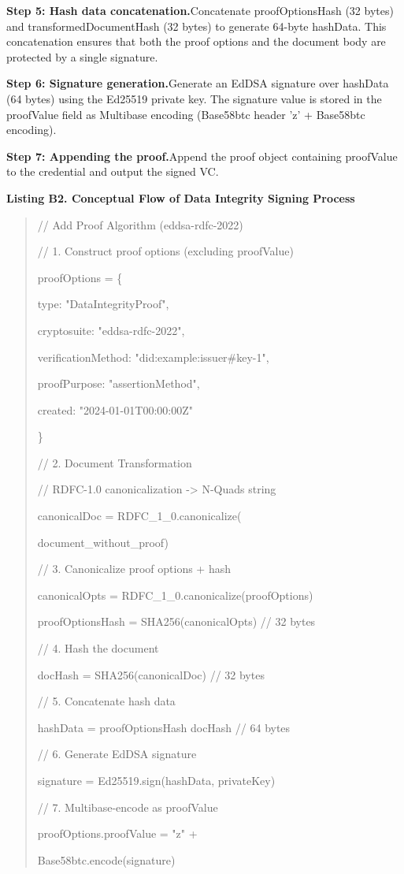 \documentclass[conference]{IEEEtran}
\begin{document}
\textbf{Step 5: Hash data concatenation.}Concatenate proofOptionsHash (32 bytes) and transformedDocumentHash (32 bytes) to generate 64-byte hashData. This concatenation ensures that both the proof options and the document body are protected by a single signature.

\textbf{Step 6: Signature generation.}Generate an EdDSA signature over hashData (64 bytes) using the Ed25519 private key. The signature value is stored in the proofValue field as Multibase encoding (Base58btc header 'z' + Base58btc encoding).

\textbf{Step 7: Appending the proof.}Append the proof object containing proofValue to the credential and output the signed VC.

\textbf{Listing B2. Conceptual Flow of Data Integrity Signing Process}

\begin{quote}
// Add Proof Algorithm (eddsa-rdfc-2022)

// 1. Construct proof options (excluding proofValue)

proofOptions = \{

type: "DataIntegrityProof",

cryptosuite: "eddsa-rdfc-2022",

verificationMethod: "did:example:issuer\#key-1",

proofPurpose: "assertionMethod",

created: "2024-01-01T00:00:00Z"

\}

// 2. Document Transformation

// RDFC-1.0 canonicalization -\textgreater{} N-Quads string

canonicalDoc = RDFC\_1\_0.canonicalize(

document\_without\_proof)

// 3. Canonicalize proof options + hash

canonicalOpts = RDFC\_1\_0.canonicalize(proofOptions)

proofOptionsHash = SHA256(canonicalOpts) // 32 bytes

// 4. Hash the document

docHash = SHA256(canonicalDoc) // 32 bytes

// 5. Concatenate hash data

hashData = proofOptionsHash \textbar\textbar{} docHash // 64 bytes

// 6. Generate EdDSA signature

signature = Ed25519.sign(hashData, privateKey)

// 7. Multibase-encode as proofValue

proofOptions.proofValue = "z" +

Base58btc.encode(signature)
\end{quote}
\end{document}
